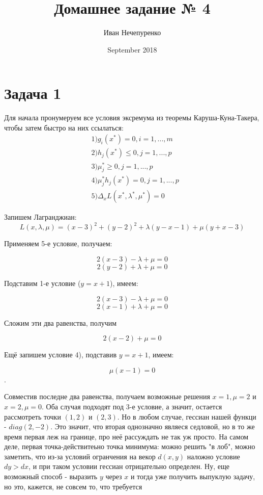 \documentclass{article}
\title{Домашнее задание № 4}
\author{Иван Нечепуренко }
\date{September 2018}
\begin{document}
\maketitle

\section{Задача 1}
Для начала пронумеруем все условия эксремума из теоремы Каруша-Куна-Такера, чтобы затем быстро на них ссылаться:
\begin{align*}
&1) g_i(x^ *) = 0, i = 1, . . . , m \\
&2) h_j(x^*) \leq 0, j = 1, . . . , p \\
&3) \mu^*_j \geq 0, j = 1, . . . , p \\
&4) \mu^*_j h_j(x^*) = 0, j = 1, . . . , p \\
&5) \Delta_x L(x^*, \lambda^*, \mu^*) = 0 
\end{align*}

Запишем Лагранджиан:
$$ L(x, \lambda, \mu) = (x - 3)^2 + (y - 2)^2 + \lambda (y - x -1) + \mu (y + x - 3)$$

Применяем 5-е условие, получаем:

$$2(x - 3) - \lambda + \mu = 0$$ 
$$ 2(y - 2) + \lambda + \mu = 0$$

Подставим 1-е условие ($y = x + 1$), имеем:

$$2(x - 3) - \lambda + \mu = 0$$ 
$$ 2(x - 1) + \lambda + \mu = 0$$

Сложим эти два равенства, получим 

$$2(x - 2) + \mu = 0 $$

Ещё запишем условие 4), подставив $y = x + 1$, имеем:

$$\mu (x - 1) = 0$$. 

Совместив последне два равенства, получаем возможные решения $x = 1, \mu = 2$ и 
$x = 2, \mu = 0$. Оба случая подходят под 3-е условие, а значит, остается рассмотреть точки $(1, 2)$ и $(2, 3)$. Но в любом случае, гессиан нашей функци - $diag(2, -2)$. Это значит, что вторая однозначно являеся седловой, но в то же время первая леж на границе,  про неё рассуждать не так уж просто. На самом деле, первая точка-действитеьно точка минимума: можно решить "в лоб", можно заметить, что из-за условий огранчения на векор $d(x, y)$ наложно условие $dy > dx$, и при таком условии гессиан отрицательно определен. Ну, еще возможный способ - выразить $y$ через $x$ и тогда уже получить выпуклую задачу, но это, кажется, не совсем то, что требуется
\end{document}
